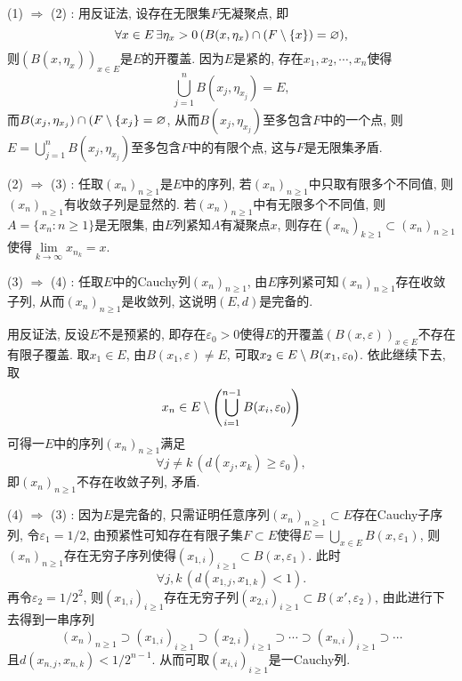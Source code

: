      \begin{Proof}
     (1) $ \Rightarrow $ (2) : 用反证法, 设存在无限集$ F $无凝聚点, 即
     \[
     \forall x\in E\,\exists\eta_x>0\,(B(x,\eta_x)\cap(F\setminus\{x\})=\varnothing),
     \]
     则$ (B(x,\eta_x))_{x\in E} $是$ E $的开覆盖. 因为$ E $是紧的, 存在$ x_1,x_2,\cdots,x_n $使得
     \[
     \bigcup_{j=1}^nB(x_j,\eta_{x_j})=E,
     \]
     而$ B(x_j,\eta_{x_j})\cap(F\setminus\{x_j\}=\varnothing $, 从而$ B(x_j,\eta_{x_j}) $至多包含$ F $中的一个点, 则$ E=\bigcup_{j=1}^nB(x_j,\eta_{x_j}) $至多包含$ F $中的有限个点, 这与$ F $是无限集矛盾.
     
     (2) $ \Rightarrow $ (3) : 任取$ (x_n)_{n\geqslant 1} $是$ E $中的序列, 若$ (x_n)_{n\geqslant 1} $中只取有限多个不同值, 则$ (x_n)_{n\geqslant 1} $有收敛子列是显然的. 若$ (x_n)_{n\geqslant 1} $中有无限多个不同值, 则$ A=\{ x_n : n\geqslant 1 \} $是无限集, 由$ E $列紧知$ A $有凝聚点$ x $, 则存在$ (x_{n_k})_{k\geqslant 1}\subset(x_n)_{n\geqslant 1} $使得$ \lim\limits_{k\to\infty}x_{n_{k}}=x $.
     
     (3) $ \Rightarrow $ (4) : 任取$ E $中的Cauchy列$ (x_n)_{n\geqslant 1} $, 由$ E $序列紧可知$ (x_n)_{n\geqslant 1} $存在收敛子列, 从而$ (x_n)_{n\geqslant 1} $是收敛列, 这说明$ (E,d) $是完备的.
     
     用反证法, 反设$ E $不是预紧的, 即存在$ \varepsilon_0>0 $使得$ E $的开覆盖$ (B(x,\varepsilon))_{x\in E} $不存在有限子覆盖. 取$ x_1\in E $, 由$ B(x_1,\varepsilon)\ne E $, 可取$ x_2\in E\setminus B(x_1,\varepsilon_0) $. 依此继续下去, 取
     \[
     x_n\in E\setminus\left( \bigcup_{i=1}^{n-1}B(x_i,\varepsilon_0) \right)
     \]
     可得一$ E $中的序列$ (x_n)_{n\geqslant 1} $满足
     \[
     \forall j\ne k\,(d(x_j,x_k)\geqslant\varepsilon_0),
     \]
     即$ (x_n)_{n\geqslant 1} $不存在收敛子列, 矛盾.
     
     (4) $ \Rightarrow $ (3) : 因为$ E $是完备的, 只需证明任意序列$ (x_n)_{n\geqslant 1}\subset E $存在Cauchy子序列, 令$ \varepsilon_1=1/2 $, 由预紧性可知存在有限子集$ F\subset E $使得$ E=\bigcup_{x\in E}B(x,\varepsilon_1) $, 则$ (x_n)_{n\geqslant 1} $存在无穷子序列使得$ (x_{1,i})_{i\geqslant 1}\subset B(x,\varepsilon_1) $. 此时
     \[
     \forall j, k\,(d(x_{1,j},x_{1,k})<1).
     \]
     再令$ \varepsilon_2=1/2^2 $, 则$ (x_{1,i})_{i\geqslant 1} $存在无穷子列$ (x_{2,i})_{i\geqslant 1}\subset B(x',\varepsilon_2) $, 由此进行下去得到一串序列
     \[
     (x_n)_{n\geqslant 1}\supset(x_{1,i})_{i\geqslant 1}\supset(x_{2,i})_{i\geqslant 1}\supset\cdots\supset(x_{n,i})_{i\geqslant 1}\supset\cdots
     \]
     且$ d(x_{n,j},x_{n,k})<1/2^{n-1} $. 从而可取$ (x_{i,i})_{i\geqslant 1} $是一Cauchy列.
     

\end{Proof}
